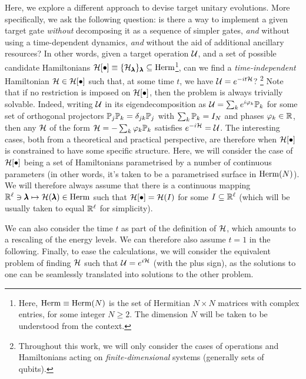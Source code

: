 Here, we explore a different approach to devise target unitary evolutions. More specifically, we ask the following question: is there a way to implement a given target gate \textit{without} decomposing it as a sequence of simpler gates, \textit{and} without using a time-dependent dynamics, \textit{and} without the aid of additional ancillary resources?
In other words, given a target operation $\mathcal{U}$, and a set of possible candidate Hamiltonians $\mathcal{H}[\bullet]\equiv \{\mathcal{H}_{\pmb{\lambda}}\}_{\pmb{\lambda}}\subseteq\operatorname{Herm}$\footnote{Here, $\operatorname{Herm}\equiv\operatorname{Herm}(N)$ is the set of Hermitian $N\times N$ matrices with complex entries, for some integer $N\ge2$. The dimension $N$ will be taken to be understood from the context.},
can we find a \textit{time-independent} Hamiltonian $\mathcal{H}\in\mathcal{H}[\bullet]$ such that, at some time $t$, we have $\mathcal{U} = e^{-it \mathcal{H}}$?
\footnote{Throughout this work, we will only consider the cases of operations and Hamiltonians acting on \textit{finite-dimensional} systems (generally sets of qubits).}
Note that if no restriction is imposed on $\mathcal{H}[\bullet]$, then the problem is always trivially solvable. Indeed, writing $\mathcal{U}$ in its eigendecomposition as
$\mathcal{U}=\sum_k e^{i\varphi_k}\mathbb{P}_k$ for some set of orthogonal projectors $\mathbb{P}_j\mathbb{P}_k=\delta_{jk}\mathbb{P}_j$ with $\sum_k\mathbb{P}_k=I_N$ and phases $\varphi_k\in\mathbb{R}$, then any $\mathcal{H}$ of the form
$\mathcal{H} = -\sum_k \varphi_k\mathbb P_k$ satisfies $e^{-i\mathcal{H}}=\cal U$.
The interesting cases, both from a theoretical and practical perspective, are therefore when $\mathcal{H}[\bullet]$ is constrained to have some specific structure.
Here, we will consider the case of $\mathcal{H}[\bullet]$ being a set of Hamiltonians parametrised by a number of continuous parameters (in other words, it's taken to be a parametrised surface in $\operatorname{Herm}(N)$).
We will therefore always assume that there is a continuous mapping $\mathbb{R}^\ell\ni\pmb{\lambda}\mapsto\mathcal{H}(\pmb{\lambda})\in\operatorname{Herm}$ such that $\mathcal{H}[\bullet]=\mathcal{H}(I)$ for some $I\subseteq\mathbb{R}^\ell$ (which will be usually taken to equal $\mathbb{R}^\ell$ for simplicity).

We can also consider the time $t$ as part of the definition of $\mathcal{H}$, which amounts to a rescaling of the energy levels. We can therefore also assume $t=1$ in the following. Finally, to ease the calculations, we will consider the equivalent problem of finding $\mathcal{H}$ such that $\mathcal{U}=e^{i\cal H}$ (with the plus sign), as the solutions to one can be seamlessly translated into solutions to the other problem.

